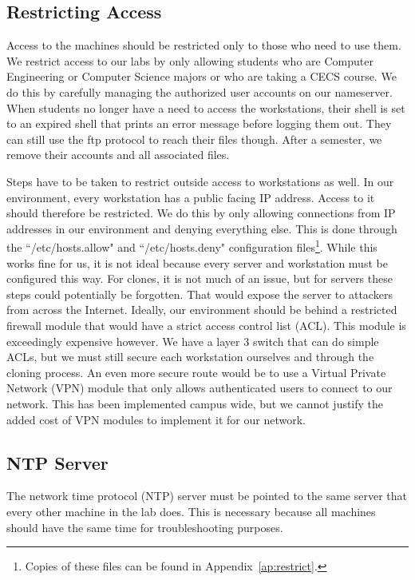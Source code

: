 \subsection{Restricting Access}
Access to the machines should be restricted only to those who need to use them.  We restrict access to our labs by only allowing students who are Computer Engineering or Computer Science majors or who are taking a CECS course.  We do this by carefully managing the authorized user accounts on our nameserver.  When students no longer have a need to access the workstations, their shell is set to an expired shell that prints an error message before logging them out.  They can still use the ftp protocol to reach their files though.  After a semester, we remove their accounts and all associated files.  

Steps have to be taken to restrict outside access to workstations as well.  In our environment, every workstation has a public facing IP address.  Access to it should therefore be restricted.  We do this by only allowing connections from IP addresses in our environment and denying everything else.  This is done through the ``/etc/hosts.allow" and ``/etc/hosts.deny" configuration files\footnote{Copies of these files can be found in Appendix~\ref{ap:restrict}.}.  While this works fine for us, it is not ideal because every server and workstation must be configured this way.  For clones, it is not much of an issue, but for servers these steps could potentially be forgotten.  That would expose the server to attackers from across the Internet.  Ideally, our environment should be behind a restricted firewall module that would have a strict access control list (ACL).  This module is exceedingly expensive however.  We have a layer 3 switch that can do simple ACLs, but we must still secure each workstation ourselves and through the cloning process.  An even more secure route would be to use a Virtual Private Network (VPN) module that only allows authenticated users to connect to our network.  This has been implemented campus wide, but we cannot justify the added cost of VPN modules to implement it for our network.

\subsection{NTP Server}
The network time protocol (NTP) server must be pointed to the same server that every other machine in the lab does.  This is necessary because all machines should have the same time for troubleshooting purposes.  

